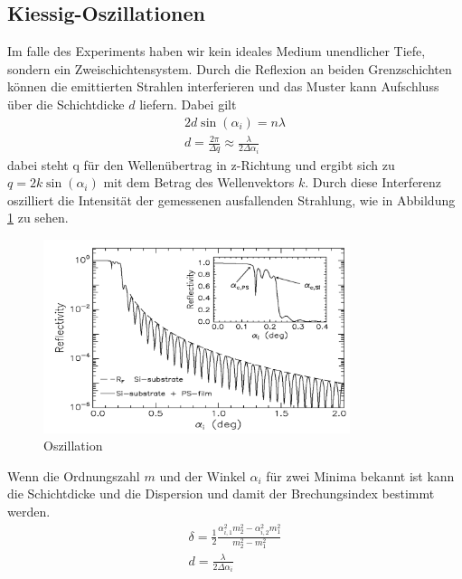     \subsection{Kiessig-Oszillationen}
        Im falle des Experiments haben wir kein ideales Medium unendlicher Tiefe, sondern ein Zweischichtensystem.
        Durch die Reflexion an beiden Grenzschichten können die emittierten Strahlen interferieren und das Muster kann Aufschluss über die Schichtdicke $d$ liefern.
        Dabei gilt
        \begin{align}
            2 d \sin\left(\alpha_i\right) = n\lambda\\
            d = \frac{2\pi}{\Delta q} ≈ \frac{\lambda}{2\Delta\alpha_i}
        \end{align}
        dabei steht q für den Wellenübertrag in z-Richtung und ergibt sich zu $q = 2k \sin\left(\alpha_i\right)$ mit dem Betrag des Wellenvektors $k$.
        Durch diese Interferenz oszilliert die Intensität der gemessenen ausfallenden Strahlung, wie in Abbildung \ref{fig:oszillation} zu sehen.
        \begin{figure}[ht]
            \centering
            \includegraphics[width = 0.8\textwidth]{bilder/Oszillation.png}
            \caption{Oszillation}
            \label{fig:oszillation}
        \end{figure}
        Wenn die Ordnungszahl $m$ und der Winkel $\alpha_i$ für zwei Minima bekannt ist kann die Schichtdicke und die Dispersion und damit der Brechungsindex bestimmt werden.
        \begin{align}
            \delta = \frac{1}{2} \frac{\alpha_{i,1}^2 m_2^2 - \alpha_{i,2}^2 m_1^2}{m_2^2 -m_1^2}\\
            d = \frac{\lambda}{2\Delta\alpha_i}
        \end{align}
